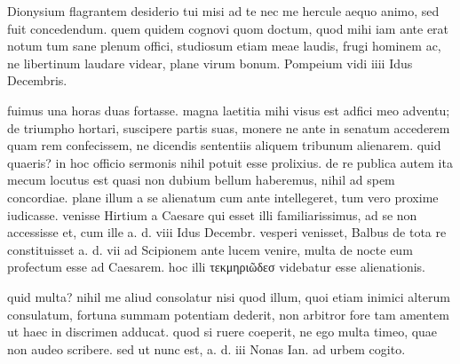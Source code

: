 


 Dionysium flagrantem desiderio tui misi ad te nec me hercule aequo animo, sed fuit concedendum. quem quidem cognovi quom doctum, quod mihi iam ante erat notum tum sane plenum offici, studiosum etiam meae laudis, frugi hominem ac, ne libertinum laudare videar, plane virum bonum. Pompeium vidi iiii Idus Decembris.

 fuimus una horas duas fortasse. magna laetitia mihi visus est adfici meo adventu; de triumpho hortari, suscipere partis suas, monere ne ante in senatum accederem quam rem confecissem, ne dicendis sententiis aliquem tribunum alienarem. quid quaeris? in hoc officio sermonis nihil potuit esse prolixius. de re publica autem ita mecum locutus est quasi non dubium bellum haberemus, nihil ad spem concordiae. plane illum a se alienatum cum ante intellegeret, tum vero proxime iudicasse. venisse Hirtium a Caesare qui esset illi familiarissimus, ad se non accessisse et, cum ille a. d. viii Idus Decembr. vesperi venisset, Balbus de tota re constituisset a. d. vii ad Scipionem ante lucem venire, multa de nocte eum profectum esse ad Caesarem. hoc illi τεκμηριῶδεσ videbatur esse alienationis.

 quid multa? nihil me aliud consolatur nisi quod illum, quoi etiam inimici alterum consulatum, fortuna summam potentiam dederit, non arbitror fore tam amentem ut haec in discrimen adducat. quod si ruere coeperit, ne ego multa timeo, quae non audeo scribere. sed ut nunc est, a. d. iii Nonas Ian. ad urbem cogito.
